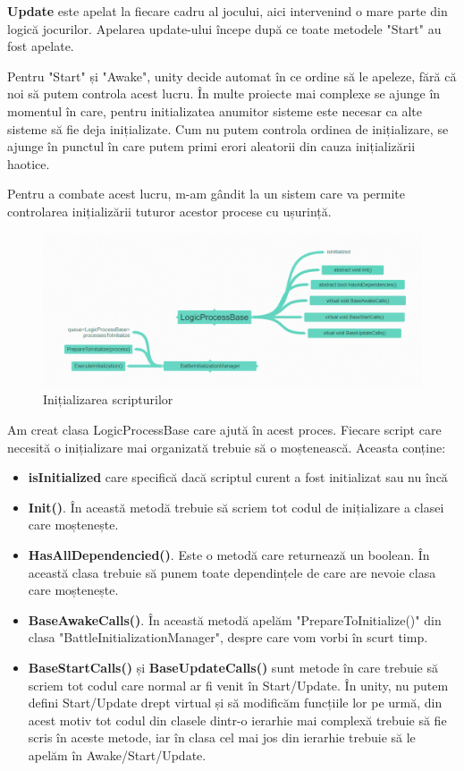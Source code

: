\documentclass[12pt, a4paper]{article}
\begin{document}
	\textbf{Update} este apelat la fiecare cadru al jocului, aici intervenind o mare parte din logică jocurilor. Apelarea update-ului începe după ce toate metodele "Start" au fost apelate.
	\newline
	
	Pentru "Start" și "Awake", unity decide automat în ce ordine să le apeleze, fără că noi să putem controla acest lucru. În multe proiecte mai complexe se ajunge în momentul în care, pentru initializatea anumitor sisteme este necesar ca alte sisteme să fie deja inițializate. Cum nu putem controla ordinea de inițializare, se ajunge în punctul în care putem primi erori aleatorii din cauza inițializării haotice.
	\newline
	
	Pentru a combate acest lucru, m-am gândit la un sistem care va permite controlarea inițializării tuturor acestor procese cu ușurință.
	
	\begin{figure}[H]
		\centering
		\includegraphics[width=1\textwidth]{logicProcessCoggle.png}
		\caption{Inițializarea scripturilor}
		\label{fig: logicProcessCoggle}
	\end{figure}
	
	Am creat clasa LogicProcessBase care ajută în acest proces. Fiecare script care necesită o inițializare mai organizată trebuie să o moștenească. Aceasta conține:
	\begin{itemize}
		\item \textbf{isInitialized} care specifică dacă scriptul curent a fost initializat sau nu încă
		\item \textbf{Init()}. În această metodă trebuie să scriem tot codul de inițializare a clasei care moștenește.
		\item \textbf{HasAllDependencied()}. Este o metodă care returnează un boolean. În această clasa trebuie să punem toate dependințele de care are nevoie clasa care moștenește.
		\item \textbf{BaseAwakeCalls()}. În această metodă apelăm "PrepareToInitialize()" din clasa "BattleInitializationManager", despre care vom vorbi în scurt timp.
		\item \textbf{BaseStartCalls()} și \textbf{BaseUpdateCalls()} sunt metode în care trebuie să scriem tot codul care normal ar fi venit în Start/Update. În unity, nu putem defini Start/Update drept virtual și să modificăm funcțiile lor pe urmă, din acest motiv tot codul din clasele dintr-o ierarhie mai complexă trebuie să fie scris în aceste metode, iar în clasa cel mai jos din ierarhie trebuie să le apelăm în Awake/Start/Update.
	\end{itemize}
	
\end{document}
